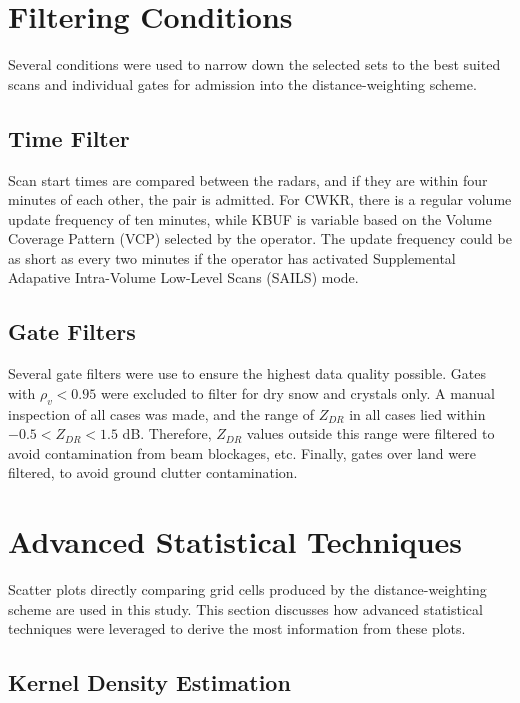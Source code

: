 \section{Filtering Conditions}
Several conditions were used to narrow down the selected sets to the best suited scans and individual gates for admission into the distance-weighting scheme.
\subsection{Time Filter}
Scan start times are compared between the radars, and if they are within four minutes of each other, the pair is admitted. For CWKR, there is a regular
volume update frequency of ten minutes, while KBUF is variable based on the Volume Coverage Pattern (VCP) selected by the operator. The update frequency
could be as short as every two minutes if the operator has activated Supplemental Adapative Intra-Volume Low-Level Scans (SAILS) mode.
\subsection{Gate Filters}
Several gate filters were use to ensure the highest data quality possible. Gates with $\rho_{v} < 0.95$ were excluded to filter for dry snow and crystals only. A manual inspection of all cases was made, and the range of $Z_{DR}$ in all cases lied within $-0.5 < Z_{DR} < 1.5$ dB. Therefore, $Z_{DR}$ values outside this range were filtered to avoid contamination from beam blockages, etc. Finally, gates over land were filtered, to avoid ground clutter contamination.
\section{Advanced Statistical Techniques}
Scatter plots directly comparing grid cells produced by the distance-weighting scheme are used in this study. This section discusses how advanced statistical
techniques were leveraged to derive the most information from these plots.
\subsection{Kernel Density Estimation}

